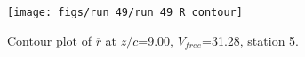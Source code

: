 \begin{figure}[H]
\centering
\texttt{[image: figs/run\_49/run\_49\_R\_contour]}
\caption{Contour plot of $\overline{r}$ at $z/c$=9.00, $V_{free}$=31.28, station 5.}
\label{fig:run_49_R_contour}
\end{figure}


